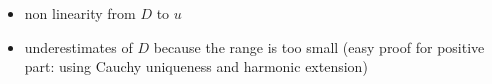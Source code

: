 \begin{itemize}
 \item non linearity from $D$ to $u$
 \item underestimates of $D$ because the range is too small (easy proof for positive part: using Cauchy uniqueness and harmonic extension)
\end{itemize}

